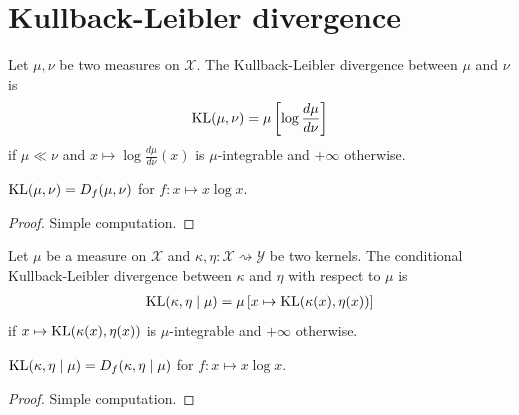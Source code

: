 \section{Kullback-Leibler divergence}

\begin{definition}
  \label{def:KL}
  \mathlibok
  Let $\mu, \nu$ be two measures on $\mathcal X$. The Kullback-Leibler divergence between $\mu$ and $\nu$ is
  \begin{align*}
  \operatorname{KL}(\mu, \nu) = \mu\left[\log \frac{d \mu}{d \nu}\right]
  \end{align*}
  if $\mu \ll \nu$ and $x \mapsto \log \frac{d \mu}{d \nu}(x)$ is $\mu$-integrable and $+\infty$ otherwise.
\end{definition}


\begin{lemma}
  \label{lem:kl_eq_fDiv}
  \leanok
  $\operatorname{KL}(\mu, \nu) = D_f(\mu, \nu)$ for $f: x \mapsto x \log x$.
\end{lemma}

\begin{proof}\leanok
Simple computation.
\end{proof}


\begin{definition}
  \label{def:condKL}
  \leanok
  Let $\mu$ be a measure on $\mathcal X$ and $\kappa, \eta : \mathcal X \rightsquigarrow \mathcal Y$ be two kernels. The conditional Kullback-Leibler divergence between $\kappa$ and $\eta$ with respect to $\mu$ is
  \begin{align*}
  \operatorname{KL}(\kappa, \eta \mid \mu) = \mu\left[x \mapsto \operatorname{KL}(\kappa(x), \eta(x))\right]
  \end{align*}
  if $x \mapsto \operatorname{KL}(\kappa(x), \eta(x))$ is $\mu$-integrable and $+\infty$ otherwise.
\end{definition}


\begin{lemma}
  \label{lem:condKL_eq_condFDiv}
  \leanok
  $\operatorname{KL}(\kappa, \eta \mid \mu) = D_f(\kappa, \eta \mid \mu)$ for $f: x \mapsto x \log x$.
\end{lemma}

\begin{proof}\leanok
Simple computation.
\end{proof}



